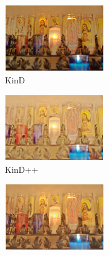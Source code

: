 \documentclass[letterpaper,12pt]{article}
\begin{document}
\begin{figure}[htbp]
\begin{subfigure}{0.18\textwidth}
			\includegraphics[width=\linewidth]{MIT-Adobe_FiveK/KinD}
			\captionsetup{font=scriptsize}
			\caption{KinD}
			\label{fig: MIT-Adobe_FiveK_f}  
		\end{subfigure}    
		\begin{subfigure}{0.18\textwidth}
			\includegraphics[width=\linewidth]{MIT-Adobe_FiveK/KinD++}
			\captionsetup{font=scriptsize}
			\caption{KinD++}
			\label{fig: MIT-Adobe_FiveK_g}
		\end{subfigure}
		\begin{subfigure}{0.18\textwidth}
			\includegraphics[width=\linewidth]{MIT-Adobe_FiveK/TBEFN}

\end{subfigure}
\end{figure}
\end{document}
